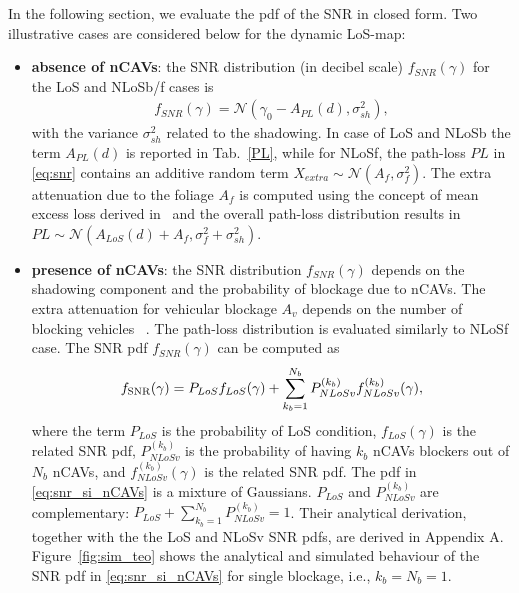 \documentclass[journal]{IEEEtran}
\begin{document}
In the following section, we evaluate the pdf of the SNR in closed form. Two illustrative cases are considered below for the dynamic LoS-map:
\begin{itemize} [wide]
    \item \textbf{absence of nCAVs}: the SNR distribution (in decibel scale) $f_{SNR}(\gamma)$ for the LoS and NLoSb/f cases is
    \begin{align}\label{eq:snr_no_nCAVs}
      f_{SNR} (\gamma) =  \mathcal{N} ( \gamma_0 - A_{PL}(d) , \sigma^2_{sh}),
    \end{align}
    with the variance $\sigma^2_{sh}$ related to the shadowing.
    In case of LoS and NLoSb the term $A_{PL}(d)$ is reported in Tab.~\ref{PL}, while for NLoSf, the path-loss $PL$ in \eqref{eq:snr} contains an additive random term
    $X_{extra} \sim \mathcal{N}(A_{f}, \sigma_{f}^2)$. %
    The extra attenuation due to the foliage $A_f$ is computed using the concept of mean excess loss derived in~\cite{goldhirsh} %
    and the overall path-loss distribution results in $PL \sim \mathcal{N}(A_{LoS}(d)+A_{f}, \sigma_{f}^2+\sigma_{sh}^2)$. %
    \item \textbf{presence of nCAVs}: the SNR distribution $f_{SNR}(\gamma)$ depends on the shadowing component and the probability of blockage due to nCAVs. The extra attenuation for vehicular blockage $A_v$ depends on the number of blocking vehicles%
    ~\cite{14rel}. The path-loss distribution is evaluated similarly to NLoSf case. The SNR pdf $f_{SNR}(\gamma)$ can be computed as
    \begin{align} \label{eq:snr_si_nCAVs}\footnotesize
        f_{\text{SNR}}(\gamma) = P_{LoS} f_{LoS}(\gamma) + \sum_{k_b = 1}^{ N_{b}} P_{NLoSv}^{(k_b)} f_{NLoSv}^{(k_b)}(\gamma),
    \end{align}
    where the term $P_{LoS}$ is the probability of LoS condition, $f_{LoS}(\gamma)$ is the related SNR pdf, $P_{NLoSv}^{(k_b)}$ is the probability of having $k_b$ nCAVs blockers out of $N_b$ nCAVs, and $f_{NLoSv}^{(k_b)}(\gamma)$ is the related SNR pdf. The pdf in \eqref{eq:snr_si_nCAVs} is a mixture of Gaussians.
     $P_{LoS}$ and  $P_{NLoSv}^{(k_b)}$ are complementary: $P_{LoS}+\sum_{k_b = 1}^{ N_{b}} P_{NLoSv}^{(k_b)} = 1$. Their analytical derivation, together with the the LoS and NLoSv SNR pdfs, are derived in Appendix A. Figure~\ref{fig:sim_teo} shows the analytical and simulated behaviour of the SNR pdf in \eqref{eq:snr_si_nCAVs} for single blockage, i.e., $k_b=N_b=1$.
\end{itemize}
\end{document}
